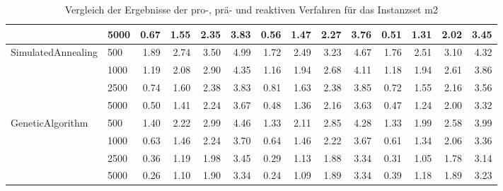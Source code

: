 \begin{table}[H]
{\begin{tabular}{ll|rrrr|rrrr|rrrr}
                 & 5000 &           0.67 & 1.55 & 2.35 & 3.83 &            0.56 & 1.47 & 2.27 & 3.76 &          0.51 & 1.31 & 2.02 & 3.45 \\ \hline
SimulatedAnnealing & 500  &           1.89 & 2.74 & 3.50 & 4.99 &            1.72 & 2.49 & 3.23 & 4.67 &          1.76 & 2.51 & 3.10 & 4.32 \\
                 & 1000 &           1.19 & 2.08 & 2.90 & 4.35 &            1.16 & 1.94 & 2.68 & 4.11 &          1.18 & 1.94 & 2.61 & 3.86 \\
                 & 2500 &           0.74 & 1.60 & 2.38 & 3.83 &            0.81 & 1.63 & 2.38 & 3.85 &          0.72 & 1.55 & 2.16 & 3.56 \\
                 & 5000 &           0.50 & 1.41 & 2.24 & 3.67 &            0.48 & 1.36 & 2.16 & 3.63 &          0.47 & 1.24 & 2.00 & 3.32 \\ \hline
GeneticAlgorithm & 500  &           1.40 & 2.22 & 2.99 & 4.46 &            1.33 & 2.11 & 2.85 & 4.28 &          1.33 & 1.99 & 2.58 & 3.99 \\
                 & 1000 &           0.63 & 1.46 & 2.24 & 3.70 &            0.64 & 1.46 & 2.22 & 3.67 &          0.61 & 1.34 & 2.06 & 3.36 \\
                 & 2500 &           0.36 & 1.19 & 1.98 & 3.45 &            0.29 & 1.13 & 1.88 & 3.34 &          0.31 & 1.05 & 1.78 & 3.14 \\
                 & 5000 &           0.26 & 1.10 & 1.90 & 3.34 &            0.24 & 1.09 & 1.89 & 3.34 &          0.39 & 1.18 & 1.89 & 3.23 \\
\bottomrule
\end{tabular}
}
\caption{Vergleich der Ergebnisse der pro-, prä- und reaktiven Verfahren für das Instanzset m2}
\label{tab:comparision_m2}
\end{table}


